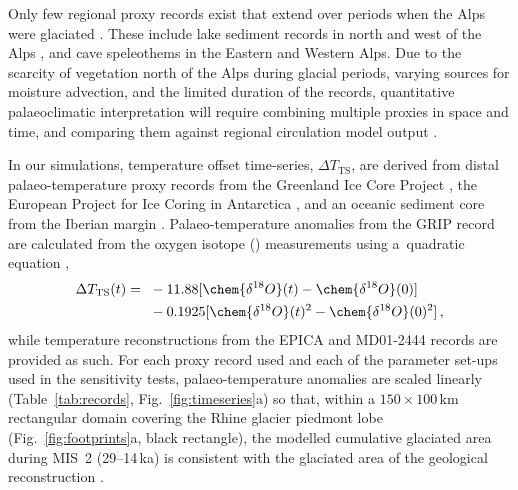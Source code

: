 \documentclass[tc, manuscript]{copernicus}
\begin{document}
    Only few regional proxy records exist that extend over periods when the Alps
    were glaciated \citep{Heiri.etal.2014}. These include lake sediment records
    in north and west of the Alps \citep[e.g.,]{Beaulieu.Reille.1992,
    Wohlfarth.etal.2008, Duprat-Oualid.etal.2017}, and cave speleothems in the
    Eastern \citep[e.g.,][]{Spotl.Mangini.2002, Boch.etal.2011} and Western
    \citep{Luetscher.etal.2015} Alps. Due to the scarcity of vegetation north
    of the Alps during glacial periods, varying sources for moisture advection,
    and the limited duration of the records, quantitative palaeoclimatic
    interpretation will require combining multiple proxies in space and time,
    and comparing them against regional circulation model output
    \citep{Heiri.etal.2014}.

    In our simulations, temperature offset time-series,
    ${\Delta}T_{\text{TS}}$, are derived from distal
    palaeo-temperature proxy records from the Greenland Ice Core Project
    \citep[GRIP;][]{Dansgaard.etal.1993}, the European Project for Ice Coring
    in Antarctica \citep[EPICA;][] {Jouzel.etal.2007}, and an oceanic sediment
    core from the Iberian margin \citep[MD01-2444;][]{Martrat.etal.2007}.
    Palaeo-temperature anomalies from the GRIP record are calculated from the
    oxygen isotope () measurements using a~quadratic
    equation \citep{Johnsen.etal.1995},
    \begin{align}
      {\Delta}T_{\text{TS}}(t) ={~}&-11.88 [\chem{\delta^{18}O}(t)
                                    -\chem{\delta^{18}O}(0)] \nonumber \\
                                   &-0.1925 [\chem{\delta^{18}O}(t)^2
                                    -\chem{\delta^{18}O}(0)^2] \,,
    \end{align}
    while temperature reconstructions from the EPICA and MD01-2444 records are
    provided as such. For each proxy record used and each of the parameter
    set-ups used in the sensitivity tests, palaeo-temperature anomalies are
    scaled linearly (Table~\ref{tab:records}, Fig.~\ref{fig:timeseries}a) so
    that, within a $150\times100$\,km rectangular domain covering the Rhine
    glacier piedmont lobe (Fig.~\ref{fig:footprints}a, black rectangle), the
    modelled cumulative glaciated area during MIS~2 (29--14\,ka) is
    consistent with the glaciated area of the geological reconstruction
    \citep{Ehlers.etal.2011}.


\end{document}
